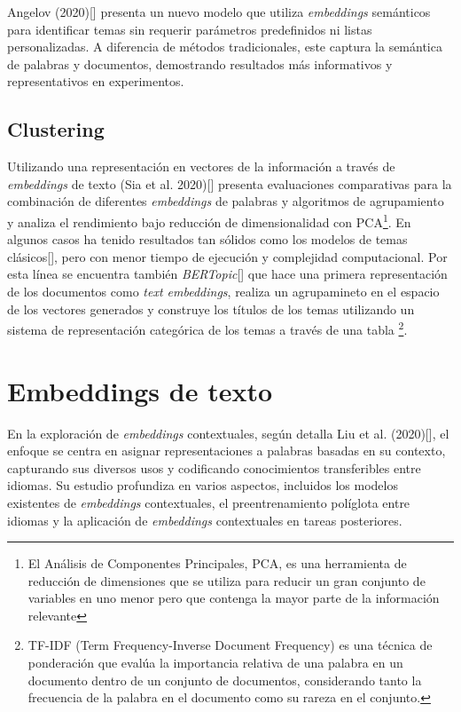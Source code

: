     Angelov (2020)[\cite{angelov2020top2vec}] presenta un nuevo modelo que utiliza \emph{embeddings} semánticos para identificar temas sin requerir parámetros predefinidos ni listas personalizadas. A diferencia de métodos tradicionales, este captura la semántica de palabras y documentos, demostrando resultados más informativos y representativos en experimentos.

    \subsection{Clustering}
    Utilizando una representación en vectores de la información a través de \emph{embeddings} de texto (Sia et al. 2020)[\cite{sia2020tired}] presenta evaluaciones comparativas para la combinación de diferentes \emph{embeddings} de palabras y algoritmos de agrupamiento y analiza el rendimiento bajo reducción de dimensionalidad con PCA\footnote{El Análisis de Componentes Principales, PCA, es una herramienta de reducción de dimensiones que se utiliza para reducir un gran conjunto de variables en uno menor pero que contenga la mayor parte de la información relevante}. En algunos casos ha tenido resultados tan sólidos como los modelos de temas clásicos[\cite{sia2020tiredResults}], pero con menor tiempo de ejecución y complejidad computacional. 
    Por esta línea se encuentra también \emph{BERTopic}[\cite{bertopic}] que hace una primera representación de los documentos como \emph{text embeddings}, realiza un agrupamineto en el espacio de los vectores generados y construye los títulos de los temas utilizando un sistema de representación categórica de los temas a través de una tabla \footnote{TF-IDF (Term Frequency-Inverse Document Frequency) es una técnica de ponderación que evalúa la importancia relativa de una palabra en un documento dentro de un conjunto de documentos, considerando tanto la frecuencia de la palabra en el documento como su rareza en el conjunto.}.

\section{Embeddings de texto}
    En la exploración de \emph{embeddings} contextuales, según detalla Liu et al. (2020)[\cite{liu2020survey}], el enfoque se centra en asignar representaciones a palabras basadas en su contexto, capturando sus diversos usos y codificando conocimientos transferibles entre idiomas. Su estudio profundiza en varios aspectos, incluidos los modelos existentes de \emph{embeddings} contextuales, el preentrenamiento políglota entre idiomas y la aplicación de \emph{embeddings} contextuales en tareas posteriores.


